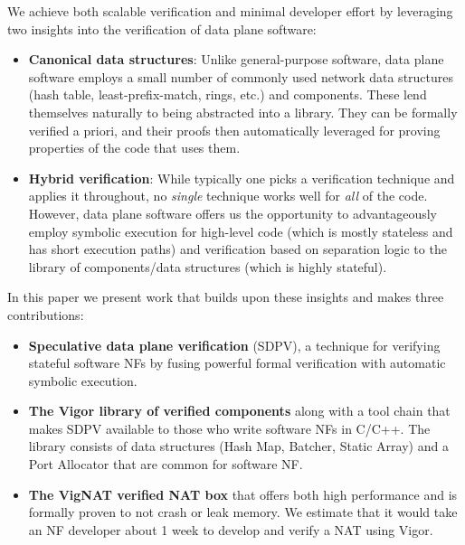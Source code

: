 \documentclass[letterpaper,twocolumn,10pt]{article}
\newcommand{\vignat}{{\sc VigNAT}\xspace}
\begin{document}
We achieve both scalable verification and minimal developer effort by leveraging two insights into the verification of data plane software:
\begin{itemize}
\item {\bf Canonical data structures}: Unlike general-purpose software, data
  plane software employs a small number of commonly used network data structures
  (hash table, least-prefix-match, rings, etc.) and components. These lend
  themselves naturally to being abstracted into a library. They can be formally
  verified a priori, and their proofs then automatically leveraged for proving
  properties of the code that uses them.
\item {\bf Hybrid verification}: While typically one picks a verification
  technique and applies it throughout, no {\em single} technique works well for
  {\em all} of the code. However, data plane software offers us the opportunity
  to advantageously employ symbolic execution for high-level code (which is
  mostly stateless and has short execution paths) and verification based on
  separation logic to the library of components/data structures (which is highly
  stateful).
     
\end{itemize}

In this paper we present work that builds upon these insights and makes three
contributions:
\begin{itemize}
\item {\bf Speculative data plane verification} (SDPV), a technique for
  verifying stateful software NFs by fusing powerful formal verification with
  automatic symbolic
  execution. %
\item {\bf The Vigor library of verified components} along with a tool chain
  that makes SDPV available to those who write software NFs in C/C++. The
  library consists of data structures (Hash Map, Batcher, Static Array) and a
  Port Allocator that are common for software
  NF. %
\item {\bf The \vignat verified NAT box} that offers both high performance and
  is formally proven to not crash or leak memory. We estimate that it would take
  an NF developer about 1 week to develop and verify a NAT using Vigor.
\end{itemize}
\end{document}
